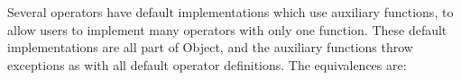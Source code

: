 \begin{comment}
</td><td style="text-align:left;width:3.4625in; " class="Table5_B3"><p class="P24">x.opIs(y)

</td></tr><tr><td style="text-align:left;width:3.4625in; " class="Table5_A3"><p class="P24">x in y

</td><td style="text-align:left;width:3.4625in; " class="Table5_B3"><p class="P24">y.opContains(x)<span class="T6"></span>(note the reversed<br/><span class="T6"><span style="margin-left:;"/><span style="margin-left:;"/><span style="margin-left:;"/></span>direction)

</td></tr><tr><td style="text-align:left;width:3.4625in; " class="Table5_A3"><p class="P24">x[y]

</td><td style="text-align:left;width:3.4625in; " class="Table5_B3"><p class="P24">x.opIndex(y)

</td></tr></table><p class="P5">
\end{comment}

Several operators have default implementations which use auxiliary functions, to allow users to implement many operators with only one function. These default implementations are all part of Object, and the auxiliary functions throw exceptions as with all default operator definitions. The equivalences are:



